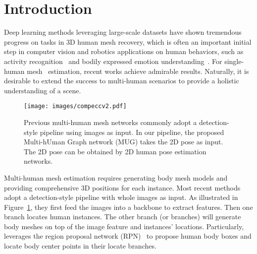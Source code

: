 \documentclass[runningheads]{llncs}
\begin{document}
\section{Introduction}
\label{sec:intro}
Deep learning methods leveraging large-scale datasets have shown tremendous progress on tasks in 3D human mesh recovery, which is often an important initial step in computer vision and robotics applications on human behaviors, such as activity recognition~\cite{ke2013review} and bodily expressed emotion understanding~\cite{wang2020panel}. For single-human mesh~\cite{kanazawa2018end,kolotouros2019convolutional,kolotouros2019learning,choi2020pose2mesh,moon2020i2l} estimation, recent works achieve admirable results.
Naturally, it is desirable to extend the success to multi-human scenarios to provide a holistic understanding of a scene. 

\begin{figure}[t!]
  \centering
  \texttt{[image: images/compeccv2.pdf]}
  \vspace{-8pt}
\caption{Previous multi-human mesh networks commonly adopt a detection-style pipeline using images as input. 
In our pipeline, the proposed Multi-hUman Graph network (MUG) takes the 2D pose as input. The 2D pose can be obtained by 2D human pose estimation networks.}
  \label{fig:comparsion}
 \vspace{-12pt} 
\end{figure}

Multi-human mesh estimation requires generating body mesh models and providing comprehensive 3D positions for each instance. Most recent methods~\cite{jiang2020coherent,zhang2021body,sun2021monocular} adopt a detection-style pipeline with whole images as input. 
As illustrated in Figure~\ref{fig:comparsion}, they first feed the images into a backbone to extract features.
Then one branch locates human instances. The other branch (or branches) will generate body meshes on top of the image feature and instances' locations. 
Particularly,~\cite{jiang2020coherent} leverages the region proposal network (RPN)~\cite{ren2015faster} to propose human body boxes 
and \cite{zhang2021body,sun2021monocular} locate body center points in their locate branches.
\end{document}

